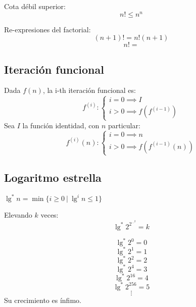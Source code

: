 \begin{fact}
	Cota débil superior:
	$$n!\le n^n$$
\end{fact}

Re-expresiones del factorial:
$$ (n+1)!=n!(n+1) $$
$$ n! =  $$

\subsection{Iteración funcional}
Dada $f(n)$, la i-th iteración funcional es:
$$f^{(i)}:
	\begin{cases}
		i=0\implies I \\
		i>0\implies f(f^{(i-1)})
	\end{cases}$$
Sea $I$ la función identidad, con $n$ particular:
$$f^{(i)}(n):
	\begin{cases}
		i=0\implies n \\
		i>0\implies f(f^{(i-1)}(n))
	\end{cases}$$

\subsection{Logaritmo estrella}
\begin{definition}
	$\lg^*n=\min\{i\ge0~|~\lg^{i}n\le1\}$

	Elevando $k$ veces:
	$$ \lg^*2^{2^{\cdots^{2}}}=k $$
\end{definition}
\begin{fact}[Crecimiento]
	$$ \lg^*2^0=0 $$
	$$ \lg^*2^1=1 $$
	$$ \lg^*2^2=2 $$
	$$ \lg^*2^4=3 $$
	$$ \lg^*2^{16}=4 $$
	$$ \lg^*2^{256}=5 $$
	$$ \vdots $$
	Su crecimiento es ínfimo.
\end{fact}


